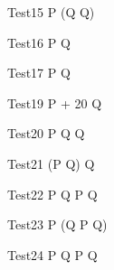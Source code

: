 \begin{circus}
    \circprocess Test15 \circdef  P \circseq (Q \circendby {} \rcirctime \circseq Q)\\
\end{circus}

 \begin{circus}
    \circprocess Test16 \circdef  P \circendby {} \rcirctime  \circseq Q \circendby {} \rcirctime\\
 \end{circus}





\begin{circus}
    \circprocess Test17 \circdef  P \circtimeout {} \rcirctime Q  \\
 \end{circus}


\begin{circus}
   \circprocess Test19 \circdef  P \circtimeout {} + 20 \rcirctime Q  \\
\end{circus}


\begin{circus}
   \circprocess Test20 \circdef  P \circseq Q \circtimeout {} \rcirctime Q  \\
\end{circus}

\begin{circus}
   \circprocess Test21 \circdef  (P \circseq Q) \circtimeout {} \rcirctime Q \\
\end{circus}

\begin{circus}
   \circprocess Test22 \circdef  P \circseq Q \circtimeout {} \rcirctime  P \circseq Q \\
\end{circus}

\begin{circus}
   \circprocess Test23 \circdef  P \circseq (Q \circtimeout {} \rcirctime P \circseq Q)\\
\end{circus}

\begin{circus}
   \circprocess Test24 \circdef  P \circtimeout {} \rcirctime Q \circtimeout {} \rcirctime P \circseq Q\\
\end{circus}

